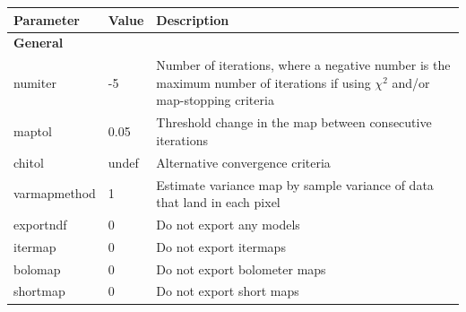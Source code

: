 \documentclass[twoside,11pt]{article}
\renewcommand{\_}{\texttt{\symbol{95}}}
\begin{document}
\begin{htmlonly}
\begin{table}
\begin{center}
\begin{small}
\begin{tabular}{|p{2.2cm}|p{1.1cm}|p{11.4cm}|}
\hline
Parameter & Value & Description \\
\hline
\multicolumn{3}{|l|}{\textbf{General}}\\
\hline
numiter       &   -5 & Number of iterations, where a negative number
                       is the maximum number of iterations
                       if using $\chi^2$ and/or map-stopping criteria \\
maptol        & 0.05 & Threshold change in the map between consecutive
                       iterations \\
chitol        & undef& Alternative convergence criteria \\
varmapmethod  &    1 & Estimate variance map by sample variance of data that
                       land in each pixel \\

exportndf     &    0 & Do not export any models \\
itermap       &    0 & Do not export itermaps \\
bolomap       &    0 & Do not export bolometer maps \\
shortmap      &    0 & Do not export short maps \\


\end{tabular}
\end{small}
\end{center}
\end{table}
\end{htmlonly}
\end{document}
